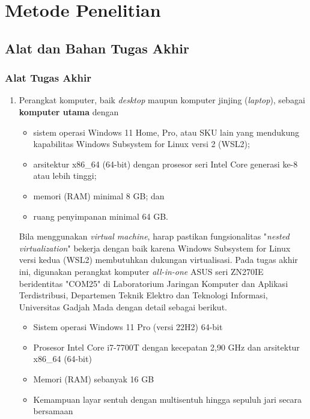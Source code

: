 \chapter{Metode Penelitian}

\section{Alat dan Bahan Tugas Akhir}

\subsection{Alat Tugas Akhir}

\begin{enumerate}
    \item Perangkat komputer, baik \textit{desktop} maupun komputer jinjing (\textit{laptop}), sebagai \textbf{komputer utama} dengan
    \begin{itemize}
        \item sistem operasi Windows 11 Home, Pro, atau SKU lain yang mendukung kapabilitas Windows Subsystem for Linux versi 2 (WSL2);
        \item arsitektur x86\_64 (64-bit) dengan prosesor seri Intel Core generasi ke-8 atau lebih tinggi;
        \item memori (RAM) minimal 8 GB; dan
        \item ruang penyimpanan minimal 64 GB.
    \end{itemize} Bila menggunakan \textit{virtual machine}, harap pastikan fungsionalitas "\textit{nested virtualization}" bekerja dengan baik karena Windows Subsystem for Linux versi kedua (WSL2) membutuhkan dukungan virtualisasi. Pada tugas akhir ini, digunakan perangkat komputer \textit{all-in-one} ASUS seri ZN270IE beridentitas "COM25" di Laboratorium Jaringan Komputer dan Aplikasi Terdistribusi, Departemen Teknik Elektro dan Teknologi Informasi, Universitas Gadjah Mada dengan detail sebagai berikut.
    \begin{itemize}
        \item Sistem operasi Windows 11 Pro (versi 22H2) 64-bit
        \item Prosesor Intel Core i7-7700T dengan kecepatan 2,90 GHz dan arsitektur x86\_64 (64-bit)
        \item Memori (RAM) sebanyak 16 GB
        \item Kemampuan layar sentuh dengan multisentuh hingga sepuluh jari secara bersamaan
    \end{itemize}


\end{enumerate}

